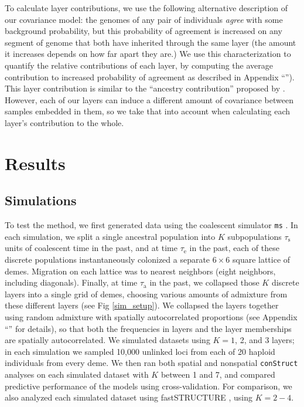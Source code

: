 \documentclass[12pt]{article}
\newcommand{\secref}[1]{``\nameref{#1}''}
\begin{document}
To calculate layer contributions, we use the following alternative description of our covariance model:
the genomes of any pair of individuals \emph{agree} with some background probability,
but this probability of agreement is increased on any segment of genome 
that both have inherited through the same layer 
(the amount it increases depends on how far apart they are.)
We use this characterization to quantify the relative contributions of each layer,
by computing the average contribution to increased probability of agreement
as described in Appendix \secref{layer_contribution}). 
This layer contribution is similar to the ``ancestry contribution'' proposed by \cite{fastStructure}. 
However, each of our layers can induce a different amount of covariance between samples embedded in them, 
so we take that into account when calculating each layer's contribution to the whole.

\section*{Results}

\subsection*{Simulations}

To test the method, we first generated data using the coalescent simulator \texttt{ms} \citep{Hudson2002}.
In each simulation,
we split a single ancestral population into $K$ subpopulations $\tau_{\text{s}}$ units of coalescent time in the past,
and at time $\tau_{\text{e}}$ in the past,
each of these discrete populations instantaneously colonized a
separate $6 \times 6$ square lattice of demes.
Migration on each lattice was to nearest neighbors (eight neighbors, including diagonals).
Finally, at time $\tau_{\text{a}}$ in the past, 
we collapsed those $K$ discrete layers into a single grid of demes,
choosing various amounts of admixture from these different layers
(see Fig \ref{sim_setup}). 
We collapsed the layers together using random admixture with spatially autocorrelated proportions 
(see Appendix \secref{sim_details} for details), 
so that both the frequencies in layers and the layer memberships are
spatially autocorrelated. 
We simulated datasets using $K=1$, 2, and 3 layers;
in each simulation we sampled 10,000 unlinked loci from each of 20 haploid individuals from every deme.
We then ran both spatial and nonspatial \texttt{conStruct} analyses on each simulated dataset with $K$ between 1 and 7,
and compared predictive performance of the models using cross-validation.
For comparison,
we also analyzed each simulated dataset using fastSTRUCTURE \citep{fastStructure}, using $K=2-4$.
\end{document}
